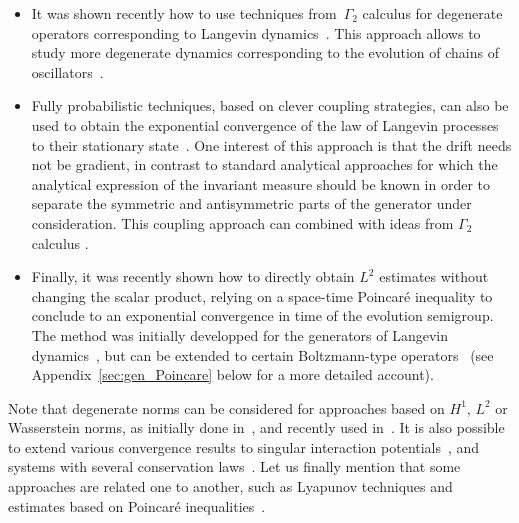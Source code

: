 \documentclass{article}
\begin{document}
\begin{itemize}
\item It was shown recently how to use techniques from~$\Gamma_2$ calculus for degenerate operators corresponding to Langevin dynamics~\cite{Baudoin17, Mon19a}. This approach allows to study more degenerate dynamics corresponding to the evolution of chains of oscillators~\cite{Menegaki19}.
  
\item Fully probabilistic techniques, based on clever coupling strategies, can also be used to obtain the exponential convergence of the law of Langevin processes to their stationary state~\cite{EGZ19}. One interest of this approach is that the drift needs not be gradient, in contrast to standard analytical approaches for which the analytical expression of the invariant measure should be known in order to separate the symmetric and antisymmetric parts of the generator under consideration. 
This coupling approach can combined with ideas from $\Gamma_2$ calculus \cite{CG14}. 

\item Finally, it was recently shown how to directly obtain $L^2$ estimates without changing the scalar product, relying on a space-time Poincar\'e inequality to conclude to an exponential convergence in time of the evolution semigroup. The method was initially developped for the generators of Langevin dynamics~\cite{AM19,CLW19}, but can be extended to certain Boltzmann-type operators~\cite{LW20} (see Appendix~\ref{sec:gen_Poincare} below for a more detailed account).
\end{itemize}
Note that degenerate norms can be considered for approaches based on $H^1$, $L^2$ or Wasserstein norms, as initially done in~\cite{Talay02}, and recently used in~\cite{Baudoin17,OL15,IOS19}. It is also possible to extend various convergence results to singular interaction potentials~\cite{HM19,Herzog18,BGH19,CHSG21}, and systems with several conservation laws~\cite{CDHMMS21}. Let us finally mention that some approaches are related one to another, such as Lyapunov techniques and estimates based on Poincar\'e inequalities~\cite{BCG08}.
\end{document}
